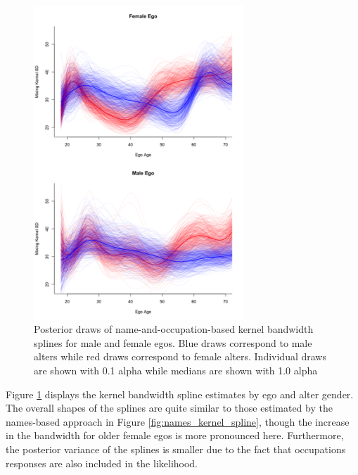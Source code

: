 \begin{figure}
\centering
	\includegraphics[width=0.7\textwidth]{figures/kernel/comb/kern_spline_overlay.png}
\caption{Posterior draws of name-and-occupation-based kernel bandwidth splines for male and female egos. Blue draws correspond to male alters while red draws correspond to female alters. Individual draws are shown with 0.1 alpha while medians are shown with 1.0 alpha}
\label{fig:comb_kernel_spline}
\end{figure}

Figure \ref{fig:comb_kernel_spline} displays the kernel bandwidth spline estimates by ego and alter gender. The overall shapes of the splines are quite similar to those estimated by the names-based approach in Figure \ref{fig:names_kernel_spline}, though the increase in the bandwidth for older female egos is more pronounced here. Furthermore, the posterior variance of the splines is smaller due to the fact that occupations responses are also included in the likelihood. 